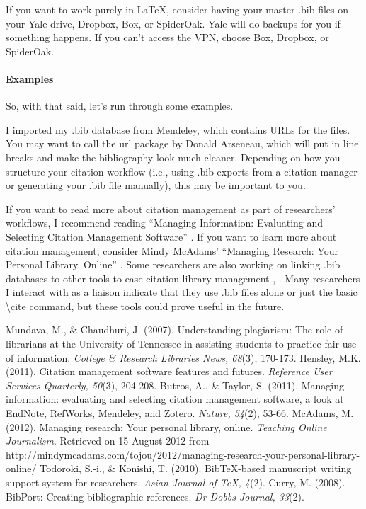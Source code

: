 \documentclass[12pt]{report}
\begin{document}
If you want to work purely in \LaTeX{}, consider having your master .bib files on your Yale drive, Dropbox, Box, or SpiderOak. Yale will do backups for you if something happens. If you can't access the VPN, choose Box, Dropbox, or SpiderOak.

\paragraph{Examples}

So, with that said, let's run through some examples.

I imported my .bib database from Mendeley, which contains URLs for the files. You may want to call the url package by Donald Arseneau, which will put in line breaks and make the bibliography look much cleaner. Depending on how you structure your citation workflow (i.e., using .bib exports from a citation manager or generating your .bib file manually), this may be important to you.

If you want to read more about citation management as part of researchers' workflows, I recommend reading ``Managing Information: Evaluating and Selecting Citation Management Software'' \cite{Butros2011}. If you want to learn more about citation management, consider Mindy McAdams' ``Managing Research: Your Personal Library, Online'' \cite{McAdams2012}. Some researchers are also working on linking .bib databases to other tools to ease citation library management \cite{Todoroki2010}, \cite{Curry2008}. Many researchers I interact with as a liaison indicate that they use .bib files alone or just the basic \textbackslash cite command, but these tools could prove useful in the future.

\begin{thebibliography}{9}
 Mundava, M., \& Chaudhuri, J. (2007). Understanding plagiarism: The role of librarians at the University of Tennessee in assisting students to practice fair use of information. \textit{College \& Research Libraries News, 68}(3), 170-173.
 Hensley, M.K. (2011). Citation management software features and futures. \textit{Reference User Services Quarterly, 50}(3), 204-208.
 Butros, A., \& Taylor, S. (2011). Managing information: evaluating and selecting citation management software, a look at EndNote, RefWorks, Mendeley, and Zotero. \textit{Nature, 54}(2), 53-66.
 McAdams, M. (2012). Managing research: Your personal library, online. \textit{Teaching Online Journalism}. Retrieved on 15 August 2012 from http://mindymcadams.com/tojou/2012/managing-research-your-personal-library-online/
 Todoroki, S.-i., \& Konishi, T. (2010). Bib\TeX -based manuscript writing support system for researchers. \textit{Asian Journal of \TeX , 4}(2).
 Curry, M. (2008). BibPort: Creating bibliographic references. \textit{Dr Dobbs Journal, 33}(2).

\end{thebibliography}
\end{document}
